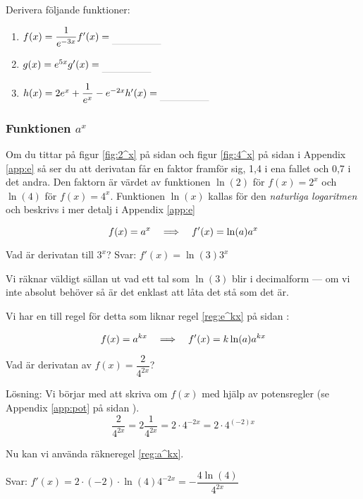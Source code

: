 \documentclass[a4paper, 12pt]{article}
\begin{document}
\begin{uppgifter}
    \label{upp:e^kx}
    Derivera följande funktioner:
    \begin{multicols}{3}
        \begin{enumerate}
            \item $f(x) = \dfrac{1}{e^{-3x}} \\ f'(x) \ans$
            \item $g(x) = e^{5x} \\ g'(x) \ans$
            \item $h(x) = 2e^x + \dfrac 1{e^x} - e^{-2x} \\ h'(x) \ans$
        \end{enumerate}
    \end{multicols}
\end{uppgifter}

\subsubsection{Funktionen $a^x$}
Om du tittar på figur \ref*{fig:2^x} på sidan \pageref*{fig:2^x} och figur \ref*{fig:4^x} på sidan \pageref*{fig:4^x} i Appendix \ref*{app:e} så ser du att derivatan får en faktor framför sig, 1,4 i ena fallet och 0,7 i det andra. Den faktorn är värdet av funktionen $\ln(2)$ för $f(x) = 2^x$ och $\ln(4)$ för $f(x) = 4^x$. Funktionen $\ln (x)$ kallas för den \emph{naturliga logaritmen} och beskrivs i mer detalj i Appendix \ref*{app:e}


\begin{regel}
    \label{reg:a^x}
    \[f(x) = a^x \hspace{1em} \Longrightarrow \hspace{1em} f'(x) = \ln (a) a^x \]
\end{regel}


\begin{exempel}
    \label{ex:a^x}
    Vad är derivatan till $3^x$?
    Svar: $f'(x) = \ln (3) 3^x$
\end{exempel}

Vi räknar väldigt sällan ut vad ett tal som $\ln(3)$ blir i decimalform --- om vi inte absolut behöver så är det enklast att låta det stå som det är.

Vi har en till regel för detta som liknar regel \ref*{reg:e^kx} på sidan \pageref*{reg:e^kx}:

\begin{regel}
    \label{reg:a^kx}
    \[f(x) = a^{kx} \hspace{1em} \Longrightarrow \hspace{1em} f'(x) = k\ln(a)a^{kx}\]
\end{regel}


\begin{exempel}
    Vad är derivatan av $f(x) = \dfrac 2{4^{2x}}$?
    
    Lösning: Vi börjar med att skriva om $f(x)$ med hjälp av potensregler (se Appendix \ref*{app:pot} på sidan \pageref*{app:pot}).
    \[\dfrac{2}{4^{2x}} = 2\dfrac{1}{4^{2x}} = 2\cdot 4^{-2x} = 2\cdot 4^{(-2)x}\]

    Nu kan vi använda räkneregel \ref*{reg:a^kx}.

    Svar: $f'(x) = 2\cdot (-2) \cdot \ln(4) 4^{-2x} = - \dfrac {4\ln(4)} {4^{2x}}$
\end{exempel}
\end{document}
